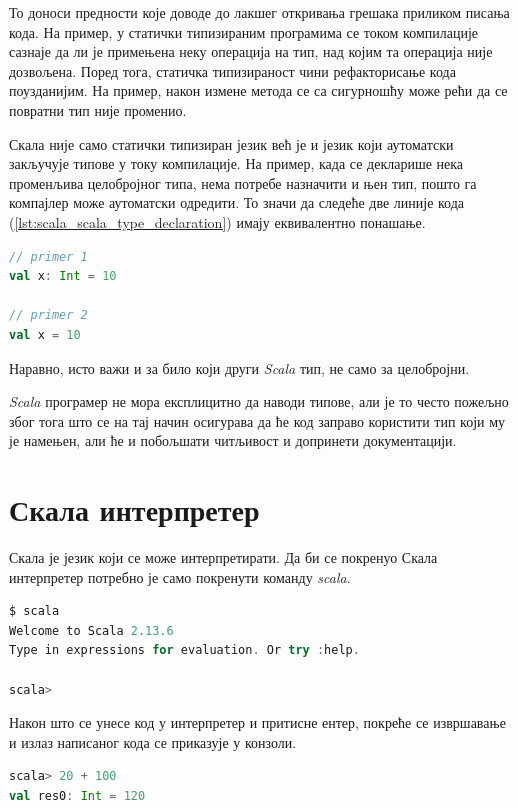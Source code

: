 \documentclass[12pt,oneside]{memoir}
\begin{document}
То доноси предности које доводе до лакшег откривања грешака приликом писања кода. На пример, у статички типизираним програмима се током компилације сазнаје да ли је примењена неку операција на тип, над којим та операција није дозвољена. Поред тога, статичка типизираност чини рефакторисање кода поузданијим. На пример, након измене метода се са сигурношћу може рећи да се повратни тип није променио. \cite{scala_prog}

Скала није само статички типизиран језик већ је и језик који аутоматски закључује типове у току компилације. На пример, када се декларише нека променљива целобројног типа, нема потребе назначити и њен тип, пошто га компајлер може аутоматски одредити. То значи да следеће две линије кода (\ref{lst:scala_scala_type_declaration}) имају еквивалентно понашање.

\begin{lstlisting}[caption={Декларација типова}, language=Scala, label={lst:scala_scala_type_declaration}]
// primer 1
val x: Int = 10

// primer 2
val x = 10
\end{lstlisting}

Наравно, исто важи и за било који други \textit{Scala} тип, не само за целобројни.

\textit{Scala} програмер не мора експлицитно да наводи типове, али је то  често пожељно због тога што се на тај начин осигурава да ће код заправо користити тип који му је намењен, али ће и побољшати читљивост и допринети документацији. \cite{scala_prog}

\section{Скала интерпретер}
\label{sec:scala_interpr}

Скала је језик који се може интерпретирати. Да би се покренуо Скала интерпретер потребно је само покренути команду \textit{scala}.

\begin{lstlisting}[language=Scala]
$ scala
Welcome to Scala 2.13.6
Type in expressions for evaluation. Or try :help.

scala>
\end{lstlisting}

Након што се унесе код у интерпретер и притисне ентер, покреће се извршавање и излаз написаног кода се приказује у конзоли.

\begin{lstlisting}[language=Scala]
scala> 20 + 100
val res0: Int = 120
\end{lstlisting}
\end{document}

